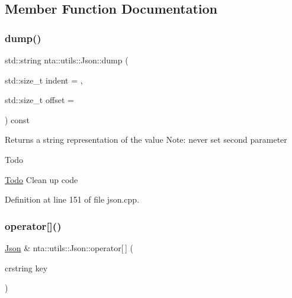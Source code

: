 \subsection{Member Function Documentation}
\mbox{\label{classnta_1_1utils_1_1Json_ab0e60f7a55d12aab005d420c8f924035}} 
\subsubsection{\texorpdfstring{dump()}{dump()}}
{\footnotesize\ttfamily std\+::string nta\+::utils\+::\+Json\+::dump (\begin{DoxyParamCaption}\item[{std\+::size\+\_\+t}]{indent = {},  }\item[{std\+::size\+\_\+t}]{offset = {} }\end{DoxyParamCaption}) const}

Returns a string representation of the value Note\+: never set second parameter

\begin{DoxyRefDesc}{Todo}
\item[\hyperlink{todo__todo000023}{Todo}]Clean up code \end{DoxyRefDesc}


Definition at line 151 of file json.\+cpp.

\mbox{\label{classnta_1_1utils_1_1Json_adf2d340a2bf7d59c537e398a1be66cf7}} 
\subsubsection{\texorpdfstring{operator[]()}{operator[]()}\hspace{0.1cm}{\footnotesize\ttfamily [1/4]}}
{\footnotesize\ttfamily \hyperlink{classnta_1_1utils_1_1Json}{Json} \& nta\+::utils\+::\+Json\+::operator\mbox{[}$\,$\mbox{]} (\begin{DoxyParamCaption}\item[{crstring}]{key }\end{DoxyParamCaption})}



